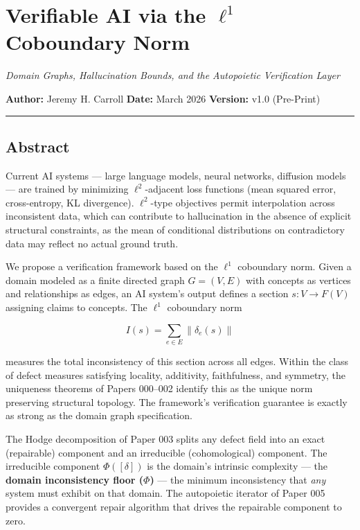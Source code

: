 \documentclass[
]{article}
\author{}
\date{}
\begin{document}
\section{\texorpdfstring{Verifiable AI via the \(\ell^1\) Coboundary
Norm}{Verifiable AI via the \textbackslash ell\^{}1 Coboundary Norm}}\label{verifiable-ai-via-the-ell1-coboundary-norm}

\emph{Domain Graphs, Hallucination Bounds, and the Autopoietic
Verification Layer}

\textbf{Author:} Jeremy H. Carroll \textbf{Date:} March 2026
\textbf{Version:} v1.0 (Pre-Print)

\begin{center}\rule{0.5\linewidth}{0.5pt}\end{center}

\subsection{Abstract}\label{abstract}

Current AI systems --- large language models, neural networks, diffusion
models --- are trained by minimizing \(\ell^2\)-adjacent loss functions
(mean squared error, cross-entropy, KL divergence). \(\ell^2\)-type
objectives permit interpolation across inconsistent data, which can
contribute to hallucination in the absence of explicit structural
constraints, as the mean of conditional distributions on contradictory
data may reflect no actual ground truth.

We propose a verification framework based on the \(\ell^1\) coboundary
norm. Given a domain modeled as a finite directed graph \(G = (V, E)\)
with concepts as vertices and relationships as edges, an AI system's
output defines a section \(s: V \to F(V)\) assigning claims to concepts.
The \(\ell^1\) coboundary norm

\[I(s) = \sum_{e \in E} \|\delta_e(s)\|\]

measures the total inconsistency of this section across all edges.
Within the class of defect measures satisfying locality, additivity,
faithfulness, and symmetry, the uniqueness theorems of Papers 000--002
identify this as the unique norm preserving structural topology. The
framework's verification guarantee is exactly as strong as the domain
graph specification.

The Hodge decomposition of Paper 003 splits any defect field into an
exact (repairable) component and an irreducible (cohomological)
component. The irreducible component \(\Phi([\delta])\) is the domain's
intrinsic complexity --- the \textbf{domain inconsistency floor
(\(\Phi\))} --- the minimum inconsistency that \emph{any} system must
exhibit on that domain. The autopoietic iterator of Paper 005 provides a
convergent repair algorithm that drives the repairable component to
zero.
\end{document}
